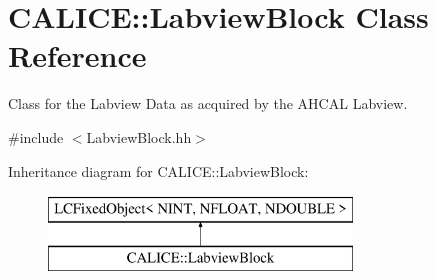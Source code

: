 \section{C\-A\-L\-I\-C\-E\-:\-:Labview\-Block Class Reference}
\label{classCALICE_1_1LabviewBlock}


Class for the Labview Data as acquired by the A\-H\-C\-A\-L Labview.  




{\ttfamily \#include $<$Labview\-Block.\-hh$>$}

Inheritance diagram for C\-A\-L\-I\-C\-E\-:\-:Labview\-Block\-:\begin{figure}[H]
\begin{center}
\leavevmode
\includegraphics[height=2.000000cm]{classCALICE_1_1LabviewBlock}
\end{center}
\end{figure}
